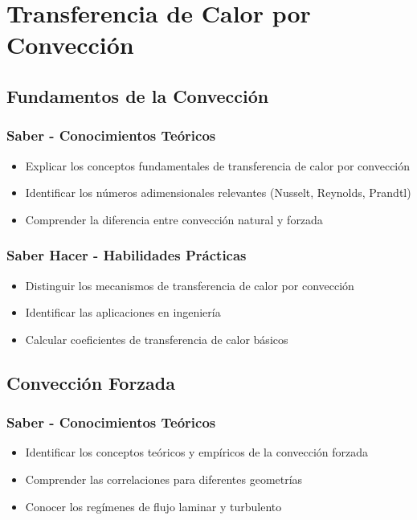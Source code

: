 \documentclass[12pt,a4paper,twoside]{book}
\begin{document}
	\chapter{Transferencia de Calor por Convección}
	\label{chap:conveccion}
	
	\section{Fundamentos de la Convección}
	\label{sec:fundamentos_conveccion}
	
	\subsection{Saber - Conocimientos Teóricos}
	\begin{saberbox}
		\begin{itemize}
			\item Explicar los conceptos fundamentales de transferencia de calor por convección
			\item Identificar los números adimensionales relevantes (Nusselt, Reynolds, Prandtl)
			\item Comprender la diferencia entre convección natural y forzada
		\end{itemize}
	\end{saberbox}
	
	\subsection{Saber Hacer - Habilidades Prácticas}
	\begin{hacerbox}
		\begin{itemize}
			\item Distinguir los mecanismos de transferencia de calor por convección
			\item Identificar las aplicaciones en ingeniería
			\item Calcular coeficientes de transferencia de calor básicos
		\end{itemize}
	\end{hacerbox}
	
	\section{Convección Forzada}
	\label{sec:conveccion_forzada}
	
	\subsection{Saber - Conocimientos Teóricos}
	\begin{saberbox}
		\begin{itemize}
			\item Identificar los conceptos teóricos y empíricos de la convección forzada
			\item Comprender las correlaciones para diferentes geometrías
			\item Conocer los regímenes de flujo laminar y turbulento
		\end{itemize}
	\end{saberbox}
	
\end{document}
